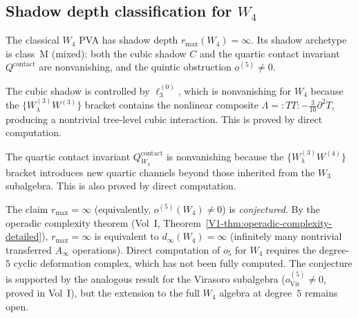 \subsection{Shadow depth classification for $W_4$}

\begin{conjecture}
The classical $W_4$ PVA has shadow depth $r_{\max}(W_4) = \infty$.
Its shadow archetype is class~M (mixed): both the cubic shadow $C$
and the quartic contact invariant $Q^{\mathrm{contact}}$ are nonvanishing,
and the quintic obstruction $o^{(5)} \neq 0$.
\end{conjecture}

\begin{remark}
The cubic shadow is controlled by $\ell_3^{(0)}$, which is nonvanishing
for $W_4$ because the $\{W^{(3)}_\lambda W^{(3)}\}$ bracket contains
the nonlinear composite $\Lambda = {:}TT{:} - \frac{3}{10}\partial^2 T$,
producing a nontrivial tree-level cubic interaction.
This is proved by direct computation.

The quartic contact invariant $Q^{\mathrm{contact}}_{W_4}$ is nonvanishing
because the $\{W^{(3)}_\lambda W^{(4)}\}$ bracket introduces new quartic
channels beyond those inherited from the $W_3$ subalgebra.
This is also proved by direct computation.

The claim $r_{\max} = \infty$ (equivalently, $o^{(5)}(W_4) \neq 0$)
is \emph{conjectured}. By the operadic complexity theorem
(Vol~I, Theorem~\ref*{V1-thm:operadic-complexity-detailed}),
$r_{\max} = \infty$ is equivalent to $d_\infty(W_4) = \infty$
(infinitely many nontrivial transferred $A_\infty$ operations).
Direct computation of $o_5$ for $W_4$ requires the degree-$5$ cyclic
deformation complex, which has not been fully computed.
The conjecture is supported by the analogous result for the Virasoro
subalgebra ($o^{(5)}_{\mathrm{Vir}} \neq 0$, proved in Vol~I), but
the extension to the full $W_4$ algebra at degree~$5$ remains open.
\end{remark}

